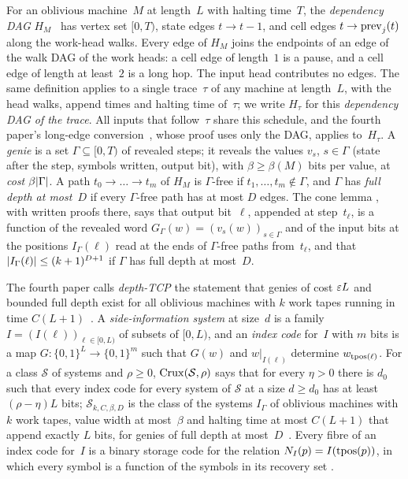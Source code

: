 For an oblivious machine~$M$ at length~$L$ with halting time~$T$, the \emph{dependency DAG}
$H_M$~\cite[Definition~4.1]{FourthPaper2026} has vertex set $[0,T)$, state edges $t\to t-1$, and cell edges
$t\to\mathrm{prev}_j(t)$ along the work-head walks. Every edge of $H_M$ joins the endpoints of an edge of the walk DAG of the
work heads: a cell edge of length~$1$ is a pause, and a cell edge of length at least~$2$ is a long hop. The input head
contributes no edges. The same definition applies to a single trace~$\tau$ of any machine at length~$L$, with the head walks,
append times and halting time of~$\tau$; we write $H_\tau$ for this \emph{dependency DAG of the trace}. All inputs that
follow~$\tau$ share this schedule, and the fourth paper's long-edge conversion~\cite[Lemma~4.21]{FourthPaper2026}, whose
proof uses only the DAG, applies to~$H_\tau$. A \emph{genie} is a set $\Gamma\subseteq[0,T)$ of revealed steps; it reveals the values
$v_s$, $s\in\Gamma$ (state after the step, symbols written, output bit), with $\beta\ge\beta(M)$ bits per value, at
\emph{cost} $\beta\lvert \Gamma \rvert$. A path $t_0\to\dots\to t_m$ of $H_M$ is $\Gamma$-free if $t_1,\dots,t_m\notin\Gamma$,
and $\Gamma$ has \emph{full depth at most~$D$} if every $\Gamma$-free path has at most $D$ edges. The cone lemma
\cite[Lemma~4.4 and Corollary~4.5]{FourthPaper2026}, with written proofs there, says that output bit~$\ell$, appended at step~$t_\ell$, is a
function of the revealed word $G_\Gamma(w)=(v_s(w))_{s\in\Gamma}$ and of the input bits at the positions $I_\Gamma(\ell)$
read at the ends of $\Gamma$-free paths from~$t_\ell$, and that $\lvert I_\Gamma(\ell) \rvert\le(k+1)^{D+1}$ if $\Gamma$ has
full depth at most~$D$.

The fourth paper calls \emph{depth-TCP} the statement that genies of cost $\varepsilon L$ and bounded full depth exist for all
oblivious machines with $k$ work tapes running in time $C(L+1)$~\cite[Definition~4.7]{FourthPaper2026}. A
\emph{side-information system} at size~$d$ is a family $I=(I(\ell))_{\ell\in[0,L)}$ of subsets of $[0,L)$, and an
\emph{index code} for~$I$ with $m$ bits is a map $G\colon\{0,1\}^L\to\{0,1\}^m$ such that $G(w)$ and $w|_{I(\ell)}$
determine $w_{\operatorname{tpos}(\ell)}$. For a class $\mathcal S$ of systems and $\rho\ge0$, $\mathrm{Crux}(\mathcal S,\rho)$ says that
for every $\eta>0$ there is $d_0$ such that every index code for every system of $\mathcal S$ at a size $d\ge d_0$ has at
least $(\rho-\eta)L$ bits; $\mathcal S_{k,C,\beta,D}$ is the class of the systems $I_\Gamma$ of oblivious machines with $k$
work tapes, value width at most~$\beta$ and halting time at most $C(L+1)$ that append exactly $L$ bits, for genies
of full depth at most~$D$~\cite[Definition~4.8]{FourthPaper2026}. Every fibre of an index code for~$I$ is a binary storage
code for the relation $N_I(p)=I(\operatorname{tpos}(p))$, in which every symbol is a function of the symbols in its recovery set
\cite[Remark~4.9(b)]{FourthPaper2026}.


